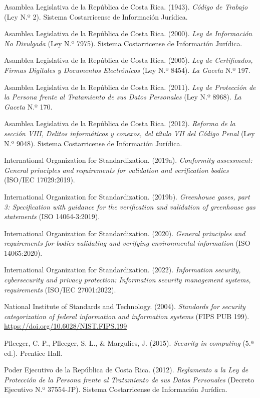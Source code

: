\documentclass[11pt,letterpaper]{article}
\begin{document}
{\small
\setlength{\parskip}{0.45em}

Asamblea Legislativa de la República de Costa Rica. (1943). \emph{Código de Trabajo} (Ley N.º 2).
Sistema Costarricense de Información Jurídica.

Asamblea Legislativa de la República de Costa Rica. (2000). \emph{Ley de Información No Divulgada}
(Ley N.º 7975). Sistema Costarricense de Información Jurídica.

Asamblea Legislativa de la República de Costa Rica. (2005). \emph{Ley de Certificados, Firmas Digitales
y Documentos Electrónicos} (Ley N.º 8454). \emph{La Gaceta} N.º 197.

Asamblea Legislativa de la República de Costa Rica. (2011). \emph{Ley de Protección de la Persona frente
al Tratamiento de sus Datos Personales} (Ley N.º 8968). \emph{La Gaceta} N.º 170.

Asamblea Legislativa de la República de Costa Rica. (2012). \emph{Reforma de la sección VIII, Delitos
informáticos y conexos, del título VII del Código Penal} (Ley N.º 9048). Sistema Costarricense de
Información Jurídica.

International Organization for Standardization. (2019a). \emph{Conformity assessment: General
principles and requirements for validation and verification bodies} (ISO/IEC 17029:2019).

International Organization for Standardization. (2019b). \emph{Greenhouse gases, part 3: Specification
with guidance for the verification and validation of greenhouse gas statements} (ISO 14064-3:2019).

International Organization for Standardization. (2020). \emph{General principles and requirements for
bodies validating and verifying environmental information} (ISO 14065:2020).

International Organization for Standardization. (2022). \emph{Information security, cybersecurity and
privacy protection: Information security management systems, requirements} (ISO/IEC 27001:2022).

National Institute of Standards and Technology. (2004). \emph{Standards for security categorization of
federal information and information systems} (FIPS PUB 199).
\url{https://doi.org/10.6028/NIST.FIPS.199}

Pfleeger, C. P., Pfleeger, S. L., \& Margulies, J. (2015). \emph{Security in computing} (5.ª ed.).
Prentice Hall.

Poder Ejecutivo de la República de Costa Rica. (2012). \emph{Reglamento a la Ley de Protección de la
Persona frente al Tratamiento de sus Datos Personales} (Decreto Ejecutivo N.º 37554-JP). Sistema
Costarricense de Información Jurídica.

}
\end{document}
